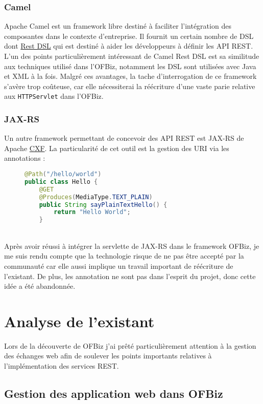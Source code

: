 \subsubsection{Camel}
Apache Camel est un framework libre destiné à faciliter l'intégration des composantes dans le contexte d'entreprise. Il fournit un certain nombre de DSL dont \href{https://camel.apache.org/rest-dsl.html}{Rest DSL} qui est destiné à aider les développeurs à définir les API REST. 
L'un des points particulièrement intéressant de Camel Rest DSL est sa similitude aux techniques utilisé dans l'OFBiz, notamment les DSL sont utilisées avec Java et XML à la fois. 
Malgré ces avantages, la tache d'interrogation de ce framework s'avère trop coûteuse, car elle nécessiterai la réécriture d'une vaste parie relative aux \verb|HTTPServlet| dans l'OFBiz. 
\subsubsection{JAX-RS}
Un autre framework permettant de concevoir des API REST est JAX-RS de Apache \href{http://cxf.apache.org/}{CXF}. La particularité de cet outil est la gestion des URI via les annotations : 
\begin{figure}[h!]
	\begin{lstlisting}[language=Java,frame=leftline]
@Path("/hello/world")
public class Hello {	
	@GET
	@Produces(MediaType.TEXT_PLAIN)
	public String sayPlainTextHello() {
		return "Hello World";
	}
	\end{lstlisting}
\end{figure}\\
Après avoir réussi à intégrer la servlette de JAX-RS dans le framework OFBiz, 
je me suis rendu compte que la technologie risque de ne pas être accepté par la communauté  car elle aussi implique un travail important de réécriture de l'existant. De plus, les annotation ne sont pas dans l'esprit du projet, donc cette idée a été abandonnée. 

\section{Analyse de l'existant}

Lors de la découverte de OFBiz j'ai prêté  particulièrement attention à la gestion des échanges web afin de soulever les points importants relatives à l'implémentation des services REST. 


\subsection{Gestion des application web dans OFBiz}


